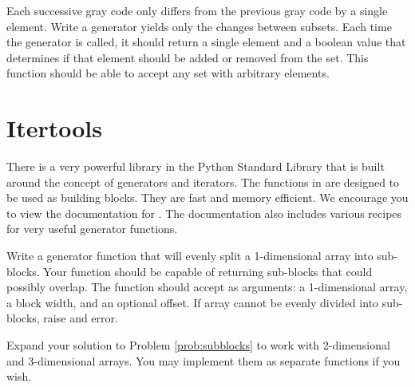 \begin{problem}
Each successive gray code only differs from the previous gray code by a single element.
Write a generator yields only the changes between subsets.  Each time the generator is called, 
it should return a single element and a boolean value that determines if that element should be
added or removed from the set.  This function should be able to accept any set with arbitrary elements.
\end{problem}

\section*{Itertools}
There is a very powerful library in the Python Standard Library that is built around the concept
of generators and iterators.  The functions in  are designed to be used as
building blocks.  They are fast and memory efficient.
We encourage you to view the documentation for .
The documentation also includes various recipes for very useful generator functions.

\begin{problem}
\label{prob:subblocks}
Write a generator function that will evenly split a 1-dimensional array into sub-blocks.
Your function should be capable of returning sub-blocks that could possibly overlap.
The function should accept as arguments: a 1-dimensional array,
a block width, and an optional offset.  If array cannot be evenly divided into
sub-blocks, raise and error.
\end{problem}

\begin{problem}
Expand your solution to Problem \ref{prob:subblocks} to work with 2-dimensional and 3-dimensional
arrays.  You may implement them as separate functions if you wish.
\end{problem}

\printbibliography

% 
